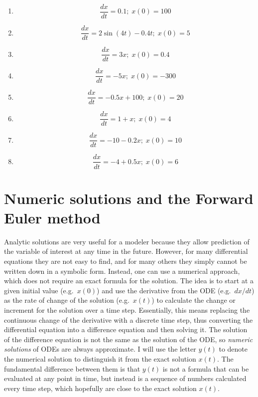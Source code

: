 \documentclass[
]{book}
\theoremstyle{definition}
\theoremstyle{definition}
\theoremstyle{definition}
\theoremstyle{remark}
\begin{document}
\begin{enumerate}
\def\labelenumi{\arabic{enumi}.}
\item
  \[ \frac{dx}{dt} = 0.1; \; x(0)= 100 \]
\item
  \[ \frac{dx}{dt} =  2\sin(4t) -0.4t; \; x(0)= 5 \]
\item
  \[ \frac{dx}{dt} = 3x; \; x(0) = 0.4 \]
\item
  \[ \frac{dx}{dt} = -5x; \;  x(0) = -300 \]
\item
  \[ \frac{dx}{dt} = -0.5x + 100 ; \; x(0) = 20 \]
\item
  \[ \frac{dx}{dt} =  1 + x; \; x(0) = 4 \]
\item
  \[ \frac{dx}{dt} =  -10 - 0.2x; \; x(0) = 10 \]
\item
  \[ \frac{dx}{dt} =  -4 + 0.5x; \; x(0) = 6 \]
\end{enumerate}

\hypertarget{numeric-solutions-and-the-forward-euler-method}{%
\section{Numeric solutions and the Forward Euler method}\label{numeric-solutions-and-the-forward-euler-method}}

Analytic solutions are very useful for a modeler because they allow prediction of the variable of interest at any time in the future. However, for many differential equations they are not easy to find, and for many others they simply cannot be written down in a symbolic form. Instead, one can use a numerical approach, which does not require an exact formula for the solution. The idea is to start at a given initial value (e.g.~\(x(0)\)) and use the derivative from the ODE (e.g.~\(dx/dt\)) as the rate of change of the solution (e.g.~\(x(t)\)) to calculate the change or increment for the solution over a time step. Essentially, this means replacing the continuous change of the derivative with a discrete time step, thus converting the differential equation into a difference equation and then solving it. The solution of the difference equation is not the same as the solution of the ODE, so  \emph{numeric solutions} of ODEs are always approximate. I will use the letter \(y(t)\) to denote the numerical solution to distinguish it from the exact solution \(x(t)\). The fundamental difference between them is that \(y(t)\) is not a formula that can be evaluated at any point in time, but instead is a sequence of numbers calculated every time step, which hopefully are close to the exact solution \(x(t)\).
\end{document}

